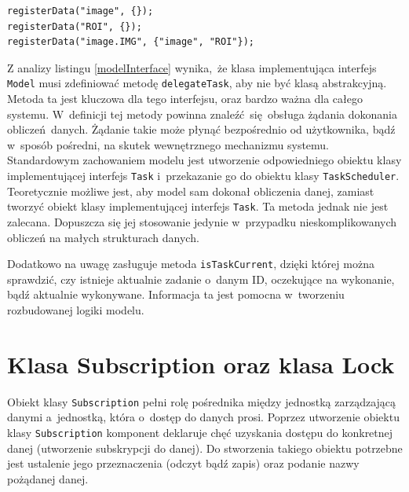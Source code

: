 \begin{minipage}{\textwidth}
	\begin{lstlisting}[label=model:registerData, caption={Przykłady rejestrowania danych},alsoletter={()[].=}]
registerData("image", {});
registerData("ROI", {});
registerData("image.IMG", {"image", "ROI"});
	\end{lstlisting}
\end{minipage}

Z analizy listingu \ref{modelInterface} wynika, że klasa implementująca interfejs \lstinline$Model$ musi zdefiniować metodę \lstinline$delegateTask$, aby nie być klasą abstrakcyjną. Metoda ta jest kluczowa dla tego interfejsu, oraz bardzo ważna dla całego systemu. W~definicji tej metody powinna znaleźć się obsługa żądania dokonania obliczeń danych. Żądanie takie może płynąć bezpośrednio od użytkownika, bądź w~sposób pośredni, na skutek wewnętrznego mechanizmu systemu. Standardowym zachowaniem modelu jest utworzenie odpowiedniego obiektu klasy implementującej interfejs \lstinline$Task$ i~przekazanie go do obiektu klasy \lstinline$TaskScheduler$. Teoretycznie możliwe jest, aby model sam dokonał obliczenia danej, zamiast tworzyć obiekt klasy implementującej interfejs \lstinline$Task$. Ta metoda jednak nie jest zalecana. Dopuszcza się jej stosowanie jedynie w~przypadku nieskomplikowanych obliczeń na małych strukturach danych. 

Dodatkowo na uwagę zasługuje metoda \lstinline$isTaskCurrent$, dzięki której można sprawdzić, czy istnieje aktualnie zadanie o~danym ID, oczekujące na wykonanie, bądź aktualnie wykonywane. Informacja ta jest pomocna w~tworzeniu rozbudowanej logiki modelu.

\section{Klasa Subscription oraz klasa Lock}
Obiekt klasy \lstinline$Subscription$ pełni rolę pośrednika między jednostką zarządzającą danymi a~jednostką, która o~dostęp do danych prosi. Poprzez utworzenie obiektu klasy \lstinline$Subscription$ komponent deklaruje chęć uzyskania dostępu do konkretnej danej (utworzenie subskrypcji do danej). Do stworzenia takiego obiektu potrzebne jest ustalenie jego przeznaczenia (odczyt bądź zapis) oraz podanie nazwy pożądanej danej.
 
